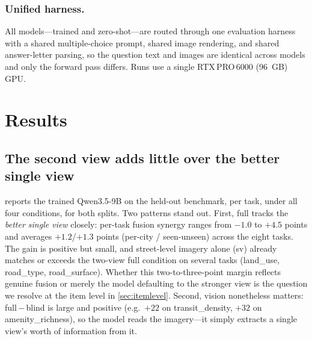 \documentclass[runningheads]{llncs}
\begin{document}
\subsubsection{Unified harness.}
All models---trained and zero-shot---are routed through one evaluation harness
with a shared multiple-choice prompt, shared image rendering, and shared
answer-letter parsing, so the question text and images are identical across
models and only the forward pass differs. Runs use a single
RTX\,PRO\,6000 (\SI{96}{GB}) GPU.

\section{Results}
\label{sec:results}

\subsection{The second view adds little over the better single view}
\label{sec:main}

 reports the trained Qwen3.5-9B on the held-out benchmark,
per task, under all four conditions, for both splits. Two patterns stand out.
First, \textsf{full} tracks the \emph{better single view} closely: per-task fusion
synergy ranges from $-1.0$ to $+4.5$ points and averages $+\num{1.2}$/$+\num{1.3}$
points (per-city / seen-unseen) across the eight tasks. The gain is positive but
small, and street-level imagery alone (\textsf{sv}) already matches or exceeds the
two-view \textsf{full} condition on several tasks (\textsf{land\_use},
\textsf{road\_type}, \textsf{road\_surface}). Whether this two-to-three-point
margin reflects genuine fusion or merely the model defaulting to the stronger view
is the question we resolve at the item level in \cref{sec:itemlevel}. Second,
vision nonetheless matters: \textsf{full}\,$-$\,\textsf{blind} is large and
positive (e.g.\ $+\num{22}$ on \textsf{transit\_density}, $+\num{32}$ on
\textsf{amenity\_richness}), so the model reads the imagery---it simply extracts a
single view's worth of information from it.
\end{document}

